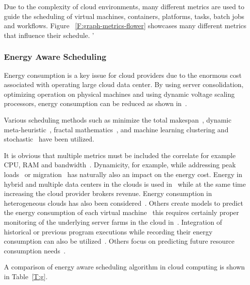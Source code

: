 \documentclass[final,5p,times,twocolumn]{elsarticle}
\begin{document}
Due to the complexity of cloud environments, many different metrics
are used to guide the scheduling of virtual machines, containers,
platforms, tasks, batch jobs and
workflows. Figure ~\ref{F:graph-metrics-flower} showcases many
different metrics that influence their schedule.  '





\subsubsection{Energy Aware Scheduling}\label{sec:energy}



Energy consumption is a key issue for cloud providers due to the
enormous cost associated with operating large cloud data center. By
using server consolidation, optimizing operation on physical machines
and using dynamic voltage scaling processors, energy consumption can
be reduced as shown in~\cite{las09dvfs,las10dvfs,calheiros2014energy}.

Various scheduling methods such as minimize the total
makespan~\cite{bessis2013using}, dynamic
meta-heuristic~\cite{bi2017application}, fractal
mathematics~\cite{duan2016energy}, and machine learning clustering and
stochastic~\cite{bui2017energy} have been utilized.


It is obvious that multiple metrics must be included the correlate for
example CPU, RAM and bandwidth~\cite{zhu2017three}. Dynamicity, for
example, while addressing peak loads~\cite{duan2016energy} or
migration~\cite{beloglazov2010energy} has naturally also an impact on
the energy cost. Energy in hybrid and multiple data centers in the
clouds is used
in~\cite{quarati2013hybrid,garg2011environment,gai2016dynamic} while
at the same time increasing the cloud provider brokers revenue. Energy
consumption in heterogeneous clouds has also been
considered~\cite{ding2015energy}.  Others create models to predict the
energy consumption of each virtual machine~\cite{kim2014energy} this
requires certainly proper monitoring of the underlying server farms in
the cloud in~\cite{van2012comparison}. Integration of historical or
previous program executions while recording their energy consumption
can also be utilized~\cite{hu2010scheduling}. Others focus on
predicting future resource consumption needs~\cite{dabbagh2015energy}.






A comparison of energy aware scheduling algorithm in cloud computing is shown in
Table~\ref{T:g}.
\end{document}
